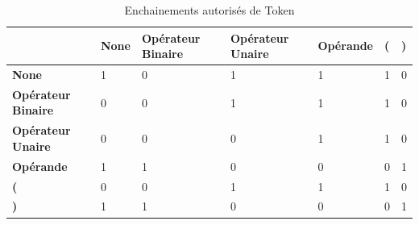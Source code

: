 \begin{table}[h!]
	\centering
	\caption{\label{tab:TokenListLegal}Enchainements autorisés de Token}
	\begin{tabular}{|L{3cm}|C{1.8cm}|C{1.8cm}|C{1.8cm}|C{1.8cm}|C{1.8cm}|C{1.8cm}|}
\hline
{}  & \textbf{None} & \textbf{Opérateur Binaire} & \textbf{Opérateur Unaire} & \textbf{Opérande} & \textbf{(} & \textbf{)} \\ \hline
\textbf{None}                & 1             & 0                            & 1                           & 1                 & 1          & 0          \\ \hline
\textbf{Opérateur Binaire} & 0             & 0                            & 1                           & 1                 & 1          & 0          \\ \hline
\textbf{Opérateur Unaire}  & 0             & 0                            & 0                           & 1                 & 1          & 0          \\ \hline
\textbf{Opérande}            & 1             & 1                            & 0                           & 0                 & 0          & 1          \\ \hline
\textbf{(}                   & 0             & 0                            & 1                           & 1                 & 1          & 0          \\ \hline
\textbf{)}                   & 1             & 1                            & 0                           & 0                 & 0          & 1          \\ \hline
\end{tabular}
\end{table}



